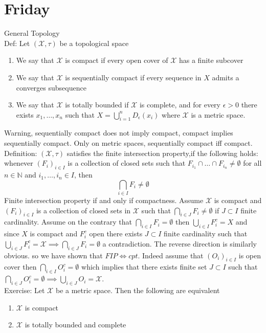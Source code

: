 \documentclass[11pt]{article}
\begin{document}
\section{Friday}
General Topology\\
Def: Let $( \mathcal{X}, \tau)$ be a topological space
\begin{enumerate}
    \item We say that $ \mathcal{X}$ is compact if every open cover of $ \mathcal{X}$ has a finite subcover
    \item  We say that $ \mathcal{X}$ is sequentially compact  if every sequence in $ X$ admits a
        converges subsequence
    \item We say that   $ \mathcal{X}$ is totally bounded if $ \mathcal{X}$ is complete, and for every $\epsilon > 0$
        there exists  $x_1,\dots,x_n$ such that $X = \bigcup_{i=1}^{n}D_\epsilon(x_i)$ where $ \mathcal{X}$ is a metric space.
\end{enumerate}
Warning, sequentially compact does not imply compact, compact implies sequentially compact. Only on metric spaces, sequentially compact iff compact.\\
Definition: $ (\mathcal{X}, \tau)$ satisfies the finite intersection property,if the following holds:
whenever $(F_i)_{i \in I}$ is a collection of closed sets such that  $F_{i_1} \cap \dots \cap F_{i_n} \ne \emptyset$  for all $n \in \mathbb{N}$ and $i_1,\dots,i_n \in I$, then
\[
    \bigcap_{i\in I} F_i \ne \emptyset
\] 
Finite intersection property if and only if compactness.
Assume $ \mathcal{X}$ is compact and $(F_i)_{i \in I}$ is a collection of closed sets in  $ \mathcal{X}$ such that $\bigcap_{i \in J} F_i \ne \emptyset $ if  $ J \subset I$ finite cardinality.
Assume on the contrary that $\bigcap_{i \in I} F_i = \emptyset$ then $\bigcup_{i \in I}F_i^{c} = X$ and since $X$ is compact and $F_i^{c}$ open there exists  $J \subset I$ finite cardinality
such that
$\bigcup_{i \in J} F_i^{c} = \mathcal{X} \implies \bigcap_{i \in J}F_i = \emptyset$ a contradiction. The reverse direction is similarly obvious.
so we have shown that $FIP \iff cpt$. Indeed assume that  $(O_i)_{i \in I}$ is open cover then  $\bigcap_{i \in I} O_i^{c} = \emptyset$ which implies that there exists finite set $J \subset I$ such that $\bigcap_{i \in J} O_i^{c} = \emptyset \implies \bigcup_{i \in J} O_i = \mathcal{X}$.
\\
Exercise: Let $ \mathcal{X}$ be a metric space. Then the following are equivalent
\begin{enumerate}
    \item $ \mathcal{X}$ is compact
    \item $ \mathcal{X}$ is totally bounded and complete
\end{enumerate}
\end{document}
